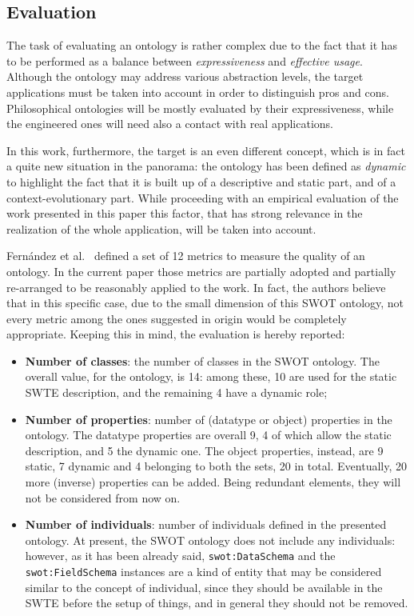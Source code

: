 \subsection{Evaluation}
\label{ssec:evaluation}
The task of evaluating an ontology is rather complex due to the fact that it has to be performed as a balance between \textit{expressiveness} and \textit{effective usage}. Although the ontology may address various abstraction levels, the target applications must be taken into account in order to distinguish pros and cons. Philosophical ontologies will be mostly evaluated by their expressiveness, while the engineered ones will need also a contact with real applications.

In this work, furthermore, the target is an even different concept, which is in fact a quite new situation in the panorama: the ontology has been defined as \textit{dynamic} to highlight the fact that it is built up of a descriptive and static part, and of a context-evolutionary part. While proceeding with an empirical evaluation of the work presented in this paper this factor, that has strong relevance in the realization of the whole application, will be taken into account.

Fern\'andez et al.~\cite{fernandez2009what} defined a set of 12 metrics to measure the quality of an ontology. In the current paper those metrics are partially adopted and partially re-arranged to be reasonably applied to the work. In fact, the authors believe that in this specific case, due to the small dimension of this SWOT ontology, not every metric among the ones suggested in origin would be completely appropriate. Keeping this in mind, the evaluation is hereby reported: 
\begin{itemize}
    \item \textbf{Number of classes}: the number of classes in the SWOT ontology. The overall value, for the ontology, is 14: among these, 10 are used for the static SWTE description, and the remaining 4 have a dynamic role;
    \item \textbf{Number of properties}: number of (datatype or object) properties in the ontology. The datatype properties are overall 9, 4 of which allow the static description, and 5 the dynamic one. The object properties, instead, are 9 static, 7 dynamic and 4 belonging to both the sets, 20 in total. Eventually, 20 more (inverse) properties can be added. Being redundant elements, they will not be considered from now on.
    
    
    \item \textbf{Number of individuals}: number of individuals defined in the presented ontology. At present, the SWOT ontology does not include any individuals: however, as it has been already said, \texttt{swot:DataSchema} and the \texttt{swot:FieldSchema} instances are a kind of entity that may be considered similar to the concept of individual, since they should be available in the SWTE before the setup of things, and in general they should not be removed.
\end{itemize}

